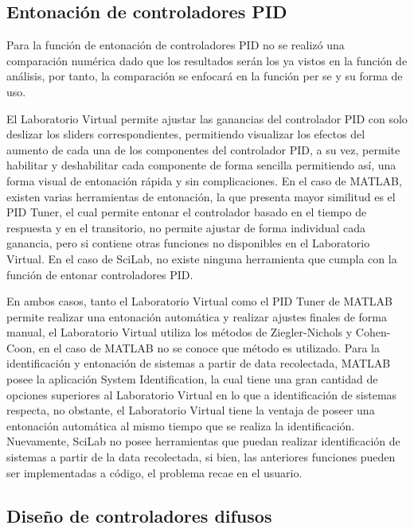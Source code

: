     \subsection{Entonación de controladores PID}
        
        Para la función de entonación de controladores PID no se realizó una comparación numérica dado que los resultados serán los ya vistos en la función de análisis, por tanto, la comparación se enfocará en la función per se y su forma de uso.

        El Laboratorio Virtual permite ajustar las ganancias del controlador PID con solo deslizar los sliders correspondientes, permitiendo visualizar los efectos del aumento de cada una de los componentes del controlador PID, a su vez, permite habilitar y deshabilitar cada componente de forma sencilla permitiendo así, una forma visual de entonación rápida y sin complicaciones. En el caso de MATLAB, existen varias herramientas de entonación, la que presenta mayor similitud es el PID Tuner, el cual permite entonar el controlador basado en el tiempo de respuesta y en el transitorio, no permite ajustar de forma individual cada ganancia, pero si contiene otras funciones no disponibles en el Laboratorio Virtual. En el caso de SciLab, no existe ninguna herramienta que cumpla con la función de entonar controladores PID.

        En ambos casos, tanto el Laboratorio Virtual como el PID Tuner de MATLAB permite realizar una entonación automática y realizar ajustes finales de forma manual, el Laboratorio Virtual utiliza los métodos de Ziegler-Nichols y Cohen-Coon, en el caso de MATLAB no se conoce que método es utilizado. Para la identificación y entonación de sistemas a partir de data recolectada, MATLAB posee la aplicación System Identification, la cual tiene una gran cantidad de opciones superiores al Laboratorio Virtual en lo que a identificación de sistemas respecta, no obstante, el Laboratorio Virtual tiene la ventaja de poseer una entonación automática al mismo tiempo que se realiza la identificación. Nuevamente, SciLab no posee herramientas que puedan realizar identificación de sistemas a partir de la data recolectada, si bien, las anteriores funciones pueden ser implementadas a código, el problema recae en el usuario.

    \subsection{Diseño de controladores difusos}

